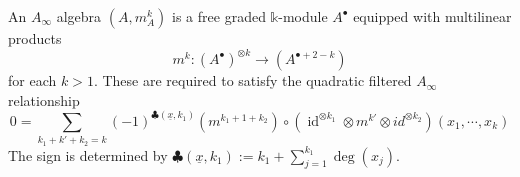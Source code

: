 
 
 
An \emph{$A_\infty$} algebra $(A, m^k_A)$ is a free graded $\mathbb{k}$-module $A^\bullet$ equipped with multilinear  products 
\[
    m^k:(A^\bullet)^{\otimes k}\to (A^{\bullet+2-k})
\]
for each $k>1$. These are required to satisfy the quadratic filtered $A_\infty$ relationship
\[
    0=\sum_{k_1+k'+k_2=k} (-1)^{\clubsuit(\underline x, k_1)} (m^{k_1+1+k_2})\circ (\operatorname{id}^{\otimes k_1}\otimes m^{k'}\otimes id^{\otimes k_2}) (x_1, \cdots ,x_k)
\]
The sign is determined by $\clubsuit(\underline x,k_1):= k_1+\sum_{j=1}^{k_1} \deg(x_j)$.

 